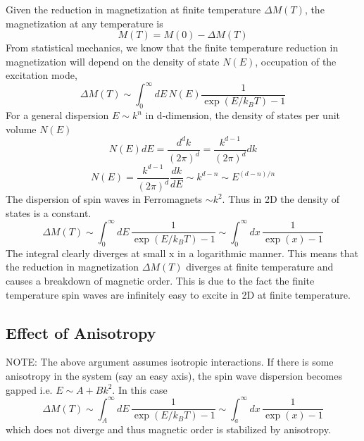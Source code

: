 \documentclass[aps,prb,onecolumn,notitlepage,showpacs,floatfix,superscriptaddress]{revtex4-1}
\begin{document}
Given the reduction in magnetization at finite temperature $\Delta M (T)$, the magnetization at any temperature is
\begin{equation}
M(T)=M(0)-\Delta M (T)
\end{equation}
From statistical mechanics, we know that the finite temperature reduction in magnetization will depend on the density of state $N(E)$, occupation of the excitation mode, 
\begin{equation}
\Delta M (T) \sim \int_0^\infty dE \, N(E) \dfrac{1}{\exp(E/k_BT)-1}
\end{equation}
For a general dispersion $E\sim k^n$ in d-dimension, the density of states per unit volume $N(E)$
\begin{equation}
N(E)dE = \dfrac{d^d k}{(2\pi)^d} = \dfrac{k^{d-1}}{(2\pi)^d} dk
\end{equation}
\begin{equation}
N(E) = \dfrac{k^{d-1}}{(2\pi)^d} \dfrac{dk}{dE} \sim k^{d-n} \sim E^{(d-n)/n}
\end{equation}
The dispersion of spin waves in Ferromagnets $\sim k^2$. Thus in 2D the density of states is a constant.
\begin{equation}
\Delta M (T) \sim \int_0^\infty dE \,  \dfrac{1}{\exp(E/k_BT)-1} \sim \int_0^\infty dx \,  \dfrac{1}{\exp(x)-1}
\end{equation}
The integral clearly diverges at small x in a logarithmic manner. This means that the reduction in magnetization $\Delta M (T)$ diverges at finite temperature and causes a breakdown of magnetic order. This is due to the fact the finite temperature spin waves are infinitely easy to excite in 2D at finite temperature.\\

\subsection{Effect of Anisotropy}
NOTE: The above argument assumes isotropic interactions. If there is some anisotropy in the system (say an easy axis), the spin wave dispersion becomes gapped i.e. $E \sim A + B k^2$. In this case
\begin{equation}
\Delta M (T) \sim \int_A^\infty dE \,  \dfrac{1}{\exp(E/k_BT)-1} \sim \int_a^\infty dx \,  \dfrac{1}{\exp(x)-1}
\end{equation}
which does not diverge and thus magnetic order is stabilized by anisotropy.
\end{document}

